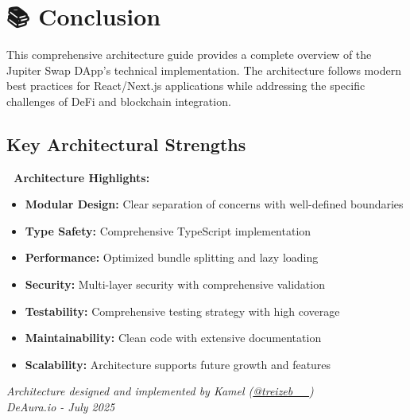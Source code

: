 \documentclass[11pt,a4paper]{article}
\begin{document}
\section{📚 Conclusion}

This comprehensive architecture guide provides a complete overview of the Jupiter Swap DApp's technical implementation. The architecture follows modern best practices for React/Next.js applications while addressing the specific challenges of DeFi and blockchain integration.

\subsection{Key Architectural Strengths}

\begin{tcolorbox}[colback=successGreen!10,colframe=successGreen]
\textbf{🎯 Architecture Highlights:}
\begin{itemize}
    \item \textbf{Modular Design:} Clear separation of concerns with well-defined boundaries
    \item \textbf{Type Safety:} Comprehensive TypeScript implementation
    \item \textbf{Performance:} Optimized bundle splitting and lazy loading
    \item \textbf{Security:} Multi-layer security with comprehensive validation
    \item \textbf{Testability:} Comprehensive testing strategy with high coverage
    \item \textbf{Maintainability:} Clean code with extensive documentation
    \item \textbf{Scalability:} Architecture supports future growth and features
\end{itemize}
\end{tcolorbox}

\vspace{1cm}

\begin{center}
\textit{Architecture designed and implemented by Kamel (\href{https://x.com/treizeb__}{@treizeb\_\_})\\
DeAura.io - July 2025}
\end{center}
\end{document}
